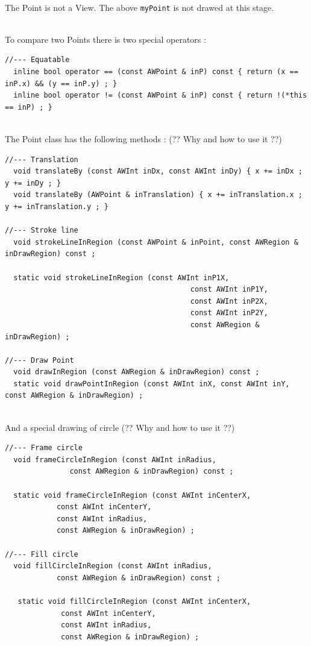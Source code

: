 \documentclass[a4paper,11pt]{extarticle}
\begin{document}
~\\ The Point is not a View. The above \texttt{myPoint} is not drawed at this stage.

~\\ To compare two Points there is two special operators :
\begin{lstlisting}[language=Arduinonl]
//--- Equatable
  inline bool operator == (const AWPoint & inP) const { return (x == inP.x) && (y == inP.y) ; }
  inline bool operator != (const AWPoint & inP) const { return !(*this == inP) ; }
\end{lstlisting}

~\\ The Point class has the following methods : (?? Why and how to use it ??)

\begin{lstlisting}[language=Arduinonl]
//--- Translation
  void translateBy (const AWInt inDx, const AWInt inDy) { x += inDx ; y += inDy ; }
  void translateBy (AWPoint & inTranslation) { x += inTranslation.x ; y += inTranslation.y ; }

//--- Stroke line
  void strokeLineInRegion (const AWPoint & inPoint, const AWRegion & inDrawRegion) const ;

  static void strokeLineInRegion (const AWInt inP1X,
                                           const AWInt inP1Y,
                                           const AWInt inP2X,
                                           const AWInt inP2Y,
                                           const AWRegion & inDrawRegion) ;

//--- Draw Point
  void drawInRegion (const AWRegion & inDrawRegion) const ;
  static void drawPointInRegion (const AWInt inX, const AWInt inY, const AWRegion & inDrawRegion) ;
\end{lstlisting}

~\\ And a special drawing of circle (?? Why and how to use it ??)

\begin{lstlisting}[language=Arduinonl]
//--- Frame circle
  void frameCircleInRegion (const AWInt inRadius,
               const AWRegion & inDrawRegion) const ;

  static void frameCircleInRegion (const AWInt inCenterX,
            const AWInt inCenterY,
            const AWInt inRadius,
            const AWRegion & inDrawRegion) ;

//--- Fill circle
  void fillCircleInRegion (const AWInt inRadius,
            const AWRegion & inDrawRegion) const ;

   static void fillCircleInRegion (const AWInt inCenterX,
             const AWInt inCenterY,
             const AWInt inRadius,
             const AWRegion & inDrawRegion) ;
\end{lstlisting}
\end{document}
